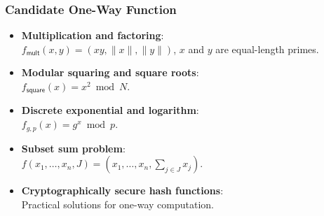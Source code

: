 \begin{comment}
\item $\mathsf{Gen}(1^n)$ obtains $I$, $\mathsf{Samp}(I)$ obtains a random $x \gets \mathcal{D}_I$. $y := f_I(x)$.
\item $\mathcal{A}$ is given $I$ and $y$ as input, and outputs $x'$.
\item $\mathsf{Invert}_{\mathcal{A},\Pi}(n) = 1$ if $f_I(x')=y$, and 0 otherwise.
\end{enumerate}
\begin{definition}
a function/permutation family $\Pi$ is \textbf{one-way} if $\forall$ \textsc{ppt} $\mathcal{A}$, $\exists\; \mathsf{negl}$ such that
\[ \Pr[\mathsf{Invert}_{\mathcal{A},\Pi}(n)=1] \le \mathsf{negl}(n). \] 
\end{definition}
\end{frame}
\end{comment}
\begin{frame}\frametitle{Candidate One-Way Function}
\begin{itemize}
\item \textbf{Multiplication and factoring}:\\
$f_{\mathsf{mult}}(x,y)=(xy,\|x\|,\|y\|)$, $x$ and $y$ are equal-length primes.
\item \textbf{Modular squaring and square roots}:\\
$f_{\mathsf{square}}(x)=x^2\bmod N$.
\item \textbf{Discrete exponential and logarithm}:\\
$f_{g,p}(x)=g^x\bmod p$.
\item \textbf{Subset sum problem}:\\
$f(x_1,\dotsc,x_n,J)=(x_1,\dotsc,x_n,\sum_{j \in J} x_j)$.
\item \textbf{Cryptographically secure hash functions}:\\
Practical solutions for one-way computation.
\end{itemize}
\end{frame}

